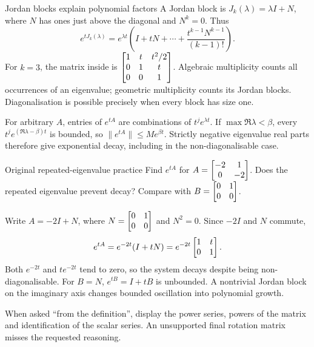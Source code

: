 \begin{concept}{Jordan blocks explain polynomial factors}
A Jordan block is $J_k(\lambda)=\lambda I+N$, where $N$ has ones just above the diagonal and $N^k=0$. Thus
\[e^{tJ_k(\lambda)}=e^{\lambda t}\left(I+tN+\cdots+\frac{t^{k-1}N^{k-1}}{(k-1)!}\right).\]
For $k=3$, the matrix inside is $\begin{bmatrix}1&t&t^2/2\\0&1&t\\0&0&1\end{bmatrix}$. Algebraic multiplicity counts all occurrences of an eigenvalue; geometric multiplicity counts its Jordan blocks. Diagonalisation is possible precisely when every block has size one.

For arbitrary $A$, entries of $e^{tA}$ are combinations of $t^je^{\lambda t}$. If $\max\Re\lambda<\beta$, every $t^je^{(\Re\lambda-\beta)t}$ is bounded, so $\|e^{tA}\|\leq Me^{\beta t}$. Strictly negative eigenvalue real parts therefore give exponential decay, including in the non-diagonalisable case.
\end{concept}
\begin{question}{Original repeated-eigenvalue practice}
Find $e^{tA}$ for $A=\begin{bmatrix}-2&1\\0&-2\end{bmatrix}$. Does the repeated eigenvalue prevent decay? Compare with $B=\begin{bmatrix}0&1\\0&0\end{bmatrix}$.
\end{question}
\begin{answer}
Write $A=-2I+N$, where $N=\begin{bmatrix}0&1\\0&0\end{bmatrix}$ and $N^2=0$. Since $-2I$ and $N$ commute,
\[e^{tA}=e^{-2t}(I+tN)=e^{-2t}\begin{bmatrix}1&t\\0&1\end{bmatrix}.\]
Both $e^{-2t}$ and $te^{-2t}$ tend to zero, so the system decays despite being non-diagonalisable. For $B=N$, $e^{tB}=I+tB$ is unbounded. A nontrivial Jordan block on the imaginary axis changes bounded oscillation into polynomial growth.
\end{answer}
\begin{tip}
When asked ``from the definition'', display the power series, powers of the matrix and identification of the scalar series. An unsupported final rotation matrix misses the requested reasoning.
\end{tip}

